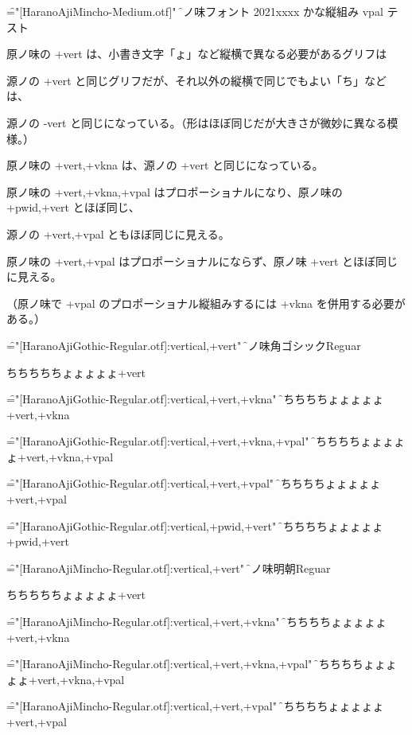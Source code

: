 

\font\f="[HaranoAjiMincho-Medium.otf]"
\f

原ノ味フォント 2021xxxx かな縦組み vpal テスト

原ノ味の +vert は、小書き文字「ょ」など縦横で異なる必要があるグリフは

源ノの +vert と同じグリフだが、それ以外の縦横で同じでもよい「ち」などは、

源ノの -vert と同じになっている。（形はほぼ同じだが大きさが微妙に異なる模様。）

原ノ味の +vert,+vkna は、源ノの +vert と同じになっている。

原ノ味の +vert,+vkna,+vpal はプロポーショナルになり、原ノ味の
+pwid,+vert とほぼ同じ、

源ノの +vert,+vpal ともほぼ同じに見える。

原ノ味の +vert,+vpal はプロポーショナルにならず、原ノ味
+vert とほぼ同じに見える。

（原ノ味で +vpal のプロポーショナル縦組みするには
+vkna を併用する必要がある。）

\font\f="[HaranoAjiGothic-Regular.otf]:vertical,+vert"
\f
原ノ味角ゴシックReguar

ちちちちちょょょょょ+vert

\font\f="[HaranoAjiGothic-Regular.otf]:vertical,+vert,+vkna"
\f

ちちちちちょょょょょ+vert,+vkna

\font\f="[HaranoAjiGothic-Regular.otf]:vertical,+vert,+vkna,+vpal"
\f
ちちちちちょょょょょ+vert,+vkna,+vpal

\font\f="[HaranoAjiGothic-Regular.otf]:vertical,+vert,+vpal"
\f
ちちちちちょょょょょ+vert,+vpal

\font\f="[HaranoAjiGothic-Regular.otf]:vertical,+pwid,+vert"
\f
ちちちちちょょょょょ+pwid,+vert

\font\f="[HaranoAjiMincho-Regular.otf]:vertical,+vert"
\f
原ノ味明朝Reguar

ちちちちちょょょょょ+vert

\font\f="[HaranoAjiMincho-Regular.otf]:vertical,+vert,+vkna"
\f

ちちちちちょょょょょ+vert,+vkna

\font\f="[HaranoAjiMincho-Regular.otf]:vertical,+vert,+vkna,+vpal"
\f
ちちちちちょょょょょ+vert,+vkna,+vpal

\font\f="[HaranoAjiMincho-Regular.otf]:vertical,+vert,+vpal"
\f
ちちちちちょょょょょ+vert,+vpal

